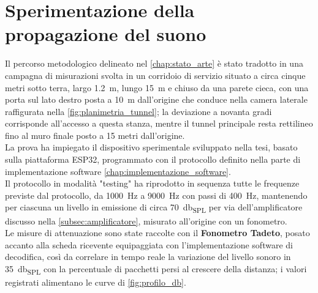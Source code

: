 \chapter{Sperimentazione della propagazione del suono}
\label{chap:sperimentazione_propagazione}

Il percorso metodologico delineato nel \autoref{chap:stato_arte} è stato tradotto in una campagna 
di misurazioni svolta in un corridoio di servizio situato a circa cinque metri sotto terra, largo 
\SI{1.2}{\meter}, lungo \SI{15}{\meter} e chiuso da una parete cieca, con una porta sul lato destro posta a \SI{10}{\meter} 
dall'origine che conduce nella camera laterale raffigurata nella \autoref{fig:planimetria_tunnel}; la deviazione a novanta gradi
 corrisponde all'accesso a questa stanza, mentre il tunnel principale resta rettilineo fino al muro finale posto a 15 metri dall'origine.\\ 
 La prova ha impiegato il dispositivo sperimentale sviluppato nella tesi, basato sulla piattaforma ESP32, 
 programmato con il protocollo definito nella parte di implementazione software \autoref{chap:implementazione_software}.\\
  Il protocollo in modalità "testing" ha riprodotto in sequenza tutte le frequenze previste dal protocollo, da \SI{1000}{\hertz} a \SI{9000}{\hertz}
   con passi di \SI{400}{\hertz}, mantenendo per ciascuna un livello in emissione di circa \SI{70}{\decibel_{SPL}} per via dell'amplificatore discusso nella
    \autoref{subsec:amplificatore}, 
    misurato all'origine con un fonometro.\\
    Le misure di attenuazione sono state raccolte con il \textbf{Fonometro Tadeto}, posato accanto alla scheda
     ricevente equipaggiata con l'implementazione software di decodifica, così da correlare in tempo reale la variazione del livello sonoro in \SI{35}{\decibel_{SPL}} con
      la percentuale di pacchetti persi al crescere della distanza; i valori registrati alimentano le curve di \autoref{fig:profilo_db}.\\

